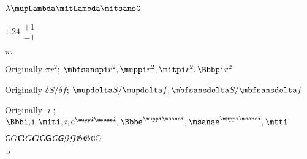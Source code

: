 \documentclass[a4paper]{article}
\begin{document}
$\lambda  \mupLambda \mitLambda \mitsansG$

$1.24 \substack{+1 \\ -1}$

$\mathup{π}π$

Originally $\pi r^2$; %
$\mbfsanspi r^2, \muppi r^2, \mitpi r^2, \Bbbpi r^2$

Originally $\delta S / \delta f$; 
$\mupdelta S / \mupdelta f, \mbfsansdelta S / \mbfsansdelta f$

Originally $\miti$; $\Bbbi, \mathrm{i}, \miti, \imath, \mathrm{e}^{\muppi 
\msansi},
\Bbbe^{\muppi \msansi}, \msanse^{\muppi \msansi}, \mtti$

$\mathsf{G}G 	𝐆 	𝐺 	𝑮 	𝖦 	𝗚 	𝘎 	𝙂 	𝒢 	𝓖 	𝔊 	𝕲 	𝙶 	𝔾$

$\intprod$
\end{document}
